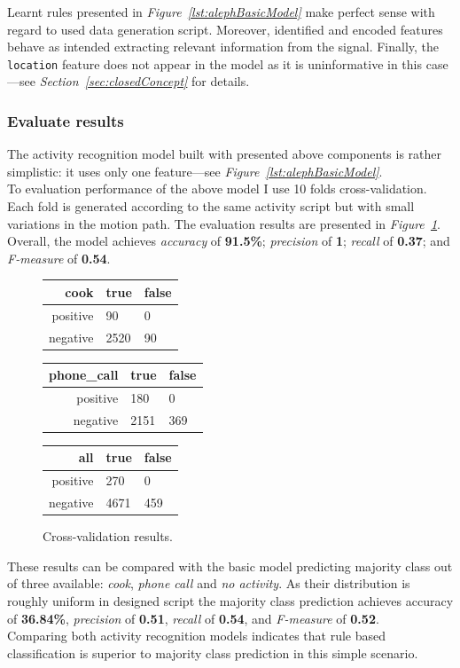 \documentclass[10pt, a4paper, pdflatex, leqno, twoside, openright]{report}
\begin{document}
Learnt rules presented in \emph{Figure~\ref{lst:alephBasicModel}} make perfect sense with regard to used data generation script. Moreover, identified and encoded features behave as intended extracting relevant information from the signal. Finally, the \texttt{location} feature does not appear in the model as it is uninformative in this case---see \emph{Section~\ref{sec:closedConcept}} for details.

      \subsubsection{Evaluate results}
The activity recognition model built with presented above components is rather simplistic: it uses only one feature---see \emph{Figure~\ref{lst:alephBasicModel}}.\\

To evaluation performance of the above model I use 10 folds cross-validation. Each fold is generated according to the same activity script but with small variations in the motion path. The evaluation results are presented in \emph{Figure~\ref{tab:basicStats}}. Overall, the model achieves \emph{accuracy} of \textbf{91.5\%}; \emph{precision} of \textbf{1}; \emph{recall} of \textbf{0.37}; and \emph{F-measure} of \textbf{0.54}.\\

\begin{figure}[htb]
  \centering
  \begin{tabular}{ r | l l}
cook & true & false\\
\hline
positive & 90 & 0\\
negative & 2520 & 90\\
  \end{tabular}
  \begin{tabular}{ r | l l}
phone\_call & true & false\\
\hline
positive & 180 & 0\\
negative & 2151 & 369\\
  \end{tabular}
  \begin{tabular}{ r | l l}
all & true & false\\
\hline
positive & 270 & 0\\
negative & 4671 & 459\\
  \end{tabular}
  \caption{Cross-validation results.\label{tab:basicStats}}
\end{figure}

These results can be compared with the basic model predicting majority class out of three available: \emph{cook}, \emph{phone call} and \emph{no activity}. As their distribution is roughly uniform in designed script the majority class prediction achieves accuracy of \textbf{36.84\%}, \emph{precision} of \textbf{0.51}, \emph{recall} of \textbf{0.54}, and \emph{F-measure} of \textbf{0.52}.\\
Comparing both activity recognition models indicates that rule based classification is superior to majority class prediction in this simple scenario.\\
\end{document}
